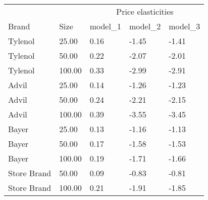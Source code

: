 \begin{table}
\centering
\begin{tabular}[t]{lllll}
\toprule
\multicolumn{2}{c}{ } & \multicolumn{3}{c}{Price elasticities} \\
\cmidrule(l{3pt}r{3pt}){3-5}
Brand & Size & model_1 & model_2 & model_3\\
\midrule
Tylenol & 25.00 & 0.16 & -1.45 & -1.41\\
Tylenol & 50.00 & 0.22 & -2.07 & -2.01\\
Tylenol & 100.00 & 0.33 & -2.99 & -2.91\\
Advil & 25.00 & 0.14 & -1.26 & -1.23\\
Advil & 50.00 & 0.24 & -2.21 & -2.15\\
Advil & 100.00 & 0.39 & -3.55 & -3.45\\
Bayer & 25.00 & 0.13 & -1.16 & -1.13\\
Bayer & 50.00 & 0.17 & -1.58 & -1.53\\
Bayer & 100.00 & 0.19 & -1.71 & -1.66\\
Store Brand & 50.00 & 0.09 & -0.83 & -0.81\\
Store Brand & 100.00 & 0.21 & -1.91 & -1.85\\
\bottomrule
\end{tabular}
\end{table}
